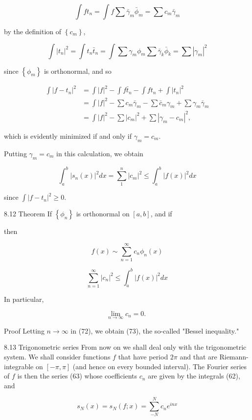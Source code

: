 \documentclass[10pt]{article}
\begin{document}
$$
\int f t_{n}=\int f \sum \bar{\gamma}_{m} \bar{\phi}_{m}=\sum c_{m} \bar{\gamma}_{m}
$$

by the definition of $\left\{c_{m}\right\}$,

$$
\int\left|t_{n}\right|^{2}=\int t_{n} \bar{t}_{n}=\int \sum \gamma_{m} \phi_{m} \sum \bar{\gamma}_{k} \bar{\phi}_{k}=\sum\left|\gamma_{m}\right|^{2}
$$

since $\left\{\phi_{m}\right\}$ is orthonormal, and so

$$
\begin{aligned}
\int\left|f-t_{n}\right|^{2} & =\int|f|^{2}-\int f \bar{t}_{n}-\int f t_{n}+\int\left|t_{n}\right|^{2} \\
& =\int|f|^{2}-\sum c_{m} \bar{\gamma}_{m}-\sum \bar{c}_{m} \gamma_{m}+\sum \gamma_{m} \bar{\gamma}_{m} \\
& =\int|f|^{2}-\sum\left|c_{m}\right|^{2}+\sum\left|\gamma_{m}-c_{m}\right|^{2},
\end{aligned}
$$

which is evidently minimized if and only if $\gamma_{m}=c_{m}$.

Putting $\gamma_{m}=c_{m}$ in this calculation, we obtain

$$
\int_{a}^{b}\left|s_{n}(x)\right|^{2} d x=\sum_{1}^{n}\left|c_{m}\right|^{2} \leq \int_{a}^{b}|f(x)|^{2} d x
$$

since $\int\left|f-t_{n}\right|^{2} \geq 0$.

8.12 Theorem If $\left\{\phi_{n}\right\}$ is orthonormal on $[a, b]$, and if

then

$$
f(x) \sim \sum_{n=1}^{\infty} c_{n} \phi_{n}(x)
$$

$$
\sum_{n=1}^{\infty}\left|c_{n}\right|^{2} \leq \int_{a}^{b}|f(x)|^{2} d x
$$

In particular,

$$
\lim _{n \rightarrow \infty} c_{n}=0 \text {. }
$$

Proof Letting $n \rightarrow \infty$ in (72), we obtain (73), the so-called "Bessel inequality."

8.13 Trigonometric series From now on we shall deal only with the trigonometric system. We shall consider functions $f$ that have period $2 \pi$ and that are Riemann-integrable on $[-\pi, \pi]$ (and hence on every bounded interval). The Fourier series of $f$ is then the series (63) whose coefficients $c_{n}$ are given by the integrals (62), and

$$
s_{N}(x)=s_{N}(f ; x)=\sum_{-N}^{N} c_{n} e^{i n x}
$$
\end{document}

